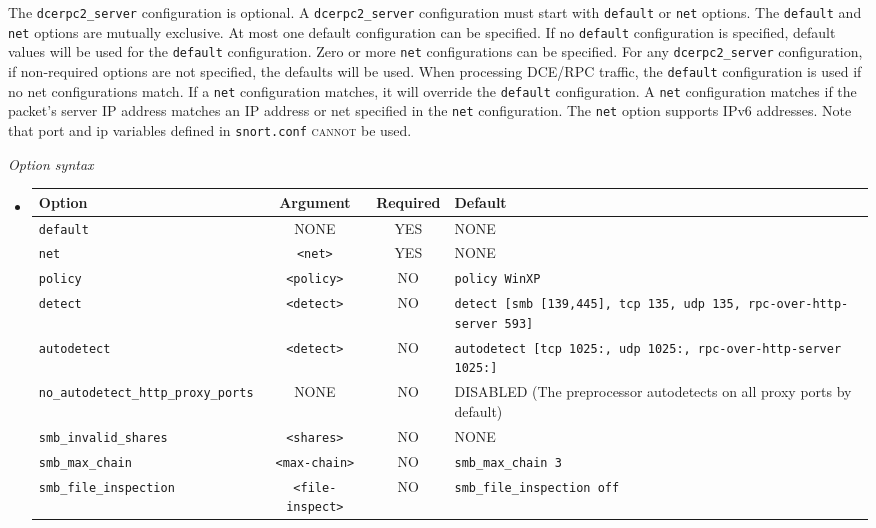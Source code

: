 \documentclass[english]{report}
\begin{document}
The \texttt{dcerpc2\_server} configuration is optional.  A
\texttt{dcerpc2\_server} configuration must start with \texttt{default} or
\texttt{net} options.  The \texttt{default} and \texttt{net} options are
mutually exclusive.  At most one default configuration can be specified. If no
\texttt{default} configuration is specified, default values will be used for
the \texttt{default} configuration.  Zero or more \texttt{net} configurations
can be specified.  For any \texttt{dcerpc2\_server} configuration, if
non-required options are not specified, the defaults will be used.  When
processing DCE/RPC traffic, the \texttt{default} configuration is used if no
net configurations match.  If a \texttt{net} configuration matches, it will
override the \texttt{default} configuration. A \texttt{net} configuration
matches if the packet's server IP address matches an IP address or net
specified in the \texttt{net} configuration.  The \texttt{net} option supports
IPv6 addresses.  Note that port and ip variables defined in \texttt{snort.conf}
\textsc{cannot} be used.

\textit{Option syntax}
\begin{itemize}
\item[]
\begin{tabular}{|l|c|c|p{6cm}|}

\hline
Option & Argument & Required & Default\\
\hline

\hline
\texttt{default} & NONE              & YES & NONE\\

\hline
\texttt{net}     & \texttt{<net>}    & YES & NONE\\

\hline
\texttt{policy}  & \texttt{<policy>} &  NO & \texttt{policy WinXP}\\

\hline
\texttt{detect}  & \texttt{<detect>} &  NO & \texttt{detect [smb [139,445], tcp
135, udp 135, rpc-over-http-server 593]}\\

\hline
\texttt{autodetect} & \texttt{<detect>} & NO & \texttt{autodetect [tcp
1025:, udp 1025:, rpc-over-http-server 1025:]}\\

\hline
\texttt{no\_autodetect\_http\_proxy\_ports} & NONE & NO & DISABLED (The
preprocessor autodetects on all proxy ports by default)\\

\hline
\texttt{smb\_invalid\_shares} & \texttt{<shares>} & NO & NONE\\

\hline
\texttt{smb\_max\_chain} & \texttt{<max-chain>} & NO & \texttt{smb\_max\_chain 3}\\

\hline
\texttt{smb\_file\_inspection} & \texttt{<file-inspect>} & NO & \texttt{smb\_file\_inspection off}\\

\hline
\end{tabular}
\end{itemize}
\end{document}
